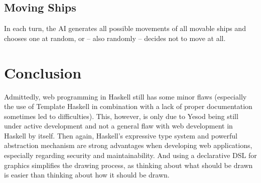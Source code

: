 \documentclass[a4paper]{easychair}
\begin{document}
\subsection{Moving Ships}
In each turn, the AI generates all possible movements of all movable ships and chooses one at random, or -- also randomly -- decides not to move at all. %

\section{Conclusion}

Admittedly, web programming in Haskell still has some minor flaws (especially the use of Template Haskell in combination with a lack of proper documentation sometimes led to difficulties). This, however, is only due to Yesod being still under active development and not a general flaw with web development in Haskell by itself. Then again, Haskell's expressive type system and powerful abstraction mechanism are strong advantages when developing web applications, especially regarding security and maintainability. And using a declarative DSL for graphics simplifies the drawing process, as thinking about what should be drawn is easier than thinking about how it should be drawn.

%
\label{sect:bib}

%
%
%
%


\end{document}
